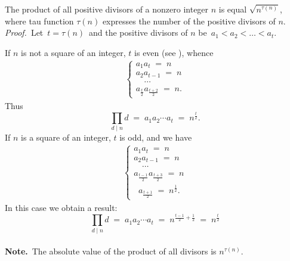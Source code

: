 \documentclass[12pt]{article}
\theoremstyle{definition}
\begin{document}
The product of all positive divisors of a nonzero integer $n$ is equal $\sqrt{n^{\tau(n)}}$, where tau function $\tau(n)$ expresses the number of the positive divisors of $n$.\\

\emph{Proof.}\, Let\, $t = \tau(n)$\, and the positive divisors of $n$ be\, 
$a_1 < a_2 < \ldots < a_t.$

If $n$ is not a square of an integer, $t$ is even (see ), whence
\begin{align*}
\begin{cases}
 a_1a_t \;=\; n\\
 a_2a_{t-1} \;=\; n\\
 \quad\cdots\\
 a_{\frac{t}{2}}a_{\frac{t+2}{2}} \;=\; n.
\end{cases}
\end{align*}
Thus
$$\prod_{d \mid n}d \;=\; a_1a_2\cdots a_t \;=\; n^{\frac{t}{2}}.$$
If $n$ is a square of an integer, $t$ is odd, and we have
\begin{align*}
\begin{cases}
 a_1a_t \;=\; n\\
 a_2a_{t-1} \;=\; n\\
 \quad\cdots\\
 a_{\frac{t-1}{2}}a_{\frac{t+3}{2}} \;=\; n\\
 \;\;a_{\frac{t+1}{2}} \;=\; n^{\frac{1}{2}}.
\end{cases}
\end{align*}
In this case we obtain a  result:
$$\prod_{d \mid n}d \;=\; a_1a_2\cdots a_t \;=\; n^{\frac{t-1}{2}+\frac{1}{2}} \;=\; n^{\frac{t}{2}}$$\\

\textbf{Note.}\, The absolute value of the product of all divisors is $n^{\tau(n)}.$



\end{document}
